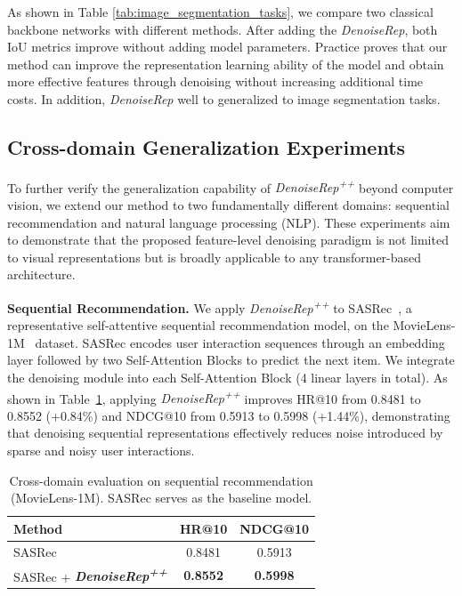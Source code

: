\documentclass[conference]{IEEEtran}
\begin{document}
{As shown in Table \ref{tab:image_segmentation_tasks}, we compare two classical backbone networks with different methods. After adding the \textit{DenoiseRep}, both IoU metrics improve without adding model parameters. Practice proves that our method can improve the representation learning ability of the model and obtain more effective features through denoising without increasing additional time costs. In addition, \textit{DenoiseRep} well to generalized to image segmentation tasks.


{\color{red}
\subsection{Cross-domain Generalization Experiments}
\label{sec:cross_domain}

To further verify the generalization capability of \textit{DenoiseRep\textsuperscript{++}} beyond computer vision, we extend our method to two fundamentally different domains: sequential recommendation and natural language processing (NLP). These experiments aim to demonstrate that the proposed feature-level denoising paradigm is not limited to visual representations but is broadly applicable to any transformer-based architecture.

\textbf{Sequential Recommendation.}
We apply \textit{DenoiseRep\textsuperscript{++}} to SASRec~\cite{kang2018self}, a representative self-attentive sequential recommendation model, on the MovieLens-1M~\cite{harper2015movielens} dataset. SASRec encodes user interaction sequences through an embedding layer followed by two Self-Attention Blocks to predict the next item. We integrate the denoising module into each Self-Attention Block (4 linear layers in total). As shown in Table~\ref{tab:cross_domain_rec}, applying \textit{DenoiseRep\textsuperscript{++}} improves HR@10 from 0.8481 to 0.8552 (+0.84\%) and NDCG@10 from 0.5913 to 0.5998 (+1.44\%), demonstrating that denoising sequential representations effectively reduces noise introduced by sparse and noisy user interactions.

\begin{table}[t]
\centering
\caption{Cross-domain evaluation on sequential recommendation (MovieLens-1M). SASRec serves as the baseline model.}
\label{tab:cross_domain_rec}
\vspace{0.2cm}
\renewcommand{\arraystretch}{1.2}
\begin{tabular}{l|cc}
\hline \hline
\textbf{Method} & \textbf{HR@10} & \textbf{NDCG@10} \\
\hline
SASRec & 0.8481 & 0.5913 \\
SASRec + \textit{\textbf{DenoiseRep\textsuperscript{++}}} & \textbf{0.8552} & \textbf{0.5998} \\
\hline \hline
\end{tabular}
\end{table}

}}
\end{document}
